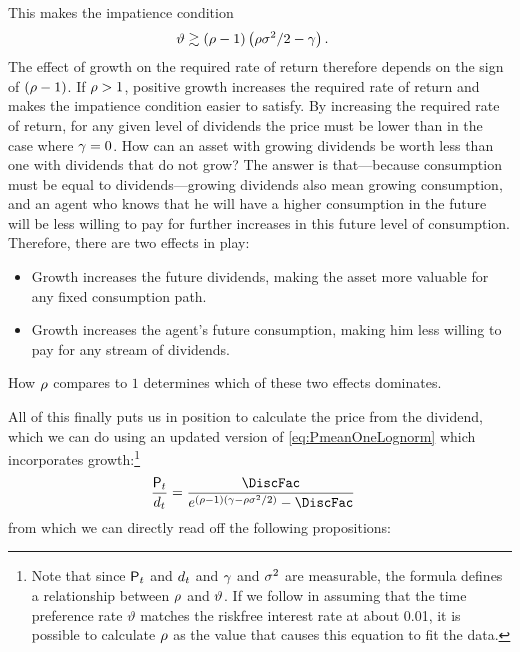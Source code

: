 \documentclass{\handout}
\begin{document}
  This makes the impatience condition
  \begin{equation}\begin{gathered}\begin{aligned} \label{eq:approx-impatience-condition-lognormal-random-walk}
        \timeRate & \gtrsim  (\CRRA-1)\left(\CRRA\riskyvar/2 - \pGro\right).
      \end{aligned}\end{gathered}\end{equation}
The effect of growth on the required rate of return therefore depends on the sign of $(\CRRA-1)$.
If $\CRRA > 1$, positive growth increases the required rate of return and makes the impatience condition easier to satisfy.
By increasing the required rate of return, for any given level of dividends the price must be lower than in the case where $\pGro=0$. 
How can an asset with growing dividends be worth less than one with dividends that do not grow?
The answer is that---because consumption must be equal to dividends---growing dividends also mean growing consumption, and an agent who knows that he will have a higher consumption in the future will be less willing to pay for further increases in this future level of consumption.
Therefore, there are two effects in play:
\begin{itemize}
	\item Growth increases the future dividends, making the asset more valuable for any fixed consumption path.
	\item Growth increases the agent's future consumption, making him less willing to pay for any stream of dividends.
\end{itemize}
How $\CRRA$ compares to $1$ determines which of these two effects dominates.

\hypertarget{PLognormGro}{}
All of this finally puts us in position to calculate the price from the dividend, which we can do using an updated version of \eqref{eq:PmeanOneLognorm} which incorporates growth:\footnote{Note that since $\Price_{t}$ and $\dvdnd_{t}$ and $\pGro$ and $\riskyvar$ are measurable, the formula defines a relationship between $\CRRA$ and $\timeRate$.  If we follow \cite{mehraPrescottPuzzle} in assuming that the time preference rate $\vartheta$ matches the riskfree interest rate at about 0.01, it is possible to calculate $\CRRA$ as the value that causes this equation to fit the data.}
\begin{equation}\begin{gathered}\begin{aligned}\providecommand{\Price}{\mathsf{P}}\providecommand{\CRRA}{\rho}\providecommand{\dvdnd}{d}\providecommand{\pGro}{\gamma}\providecommand{\riskyvar}{\sigma^{2}}\providecommand{\timeRate}{\vartheta}
  \frac{\Price_{t}}{\dvdnd_{t}} 
 & =  \frac{\DiscFac}{e^{(\CRRA-1)(\pGro - \CRRA\riskyvar/2)} - \DiscFac}\label{eq:PLognormGro}
\end{aligned}\end{gathered}\end{equation}
from which we can directly read off the following propositions:
\medskip
\end{document}
